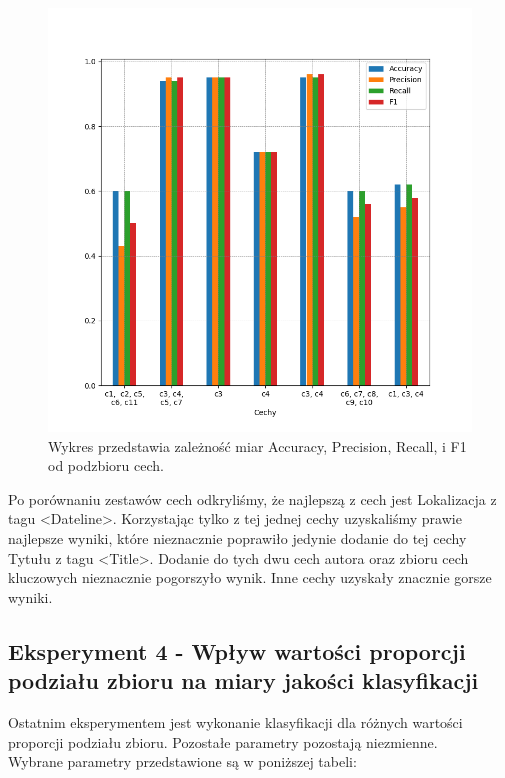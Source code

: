 \documentclass{classrep}
\begin{document}
\begin{figure}[h!]
 \centering
 \includegraphics[width=15cm]{wykres_cechy.png}
 \vspace{-0.3cm}
 \caption{Wykres przedstawia zależność miar Accuracy, Precision, Recall, i F1 od podzbioru cech.}
 \label{wykres3}
\end{figure}

\newpage

Po porównaniu zestawów cech odkryliśmy, że najlepszą z cech jest Lokalizacja z tagu \textless Dateline\textgreater. Korzystając tylko z tej jednej cechy uzyskaliśmy prawie najlepsze wyniki, które nieznacznie poprawiło jedynie dodanie do tej cechy Tytułu z tagu \textless Title\textgreater. Dodanie do tych dwu cech autora oraz zbioru cech kluczowych nieznacznie pogorszyło wynik. Inne cechy uzyskały znacznie gorsze wyniki.  \\


\subsection{Eksperyment 4 - Wpływ wartości proporcji podziału zbioru na miary jakości klasyfikacji}
\label{subsection:ex4}
Ostatnim eksperymentem jest wykonanie klasyfikacji dla różnych wartości proporcji podziału zbioru. Pozostałe parametry pozostają niezmienne.\\ 
Wybrane parametry przedstawione są w poniższej tabeli:
 
\end{document}
